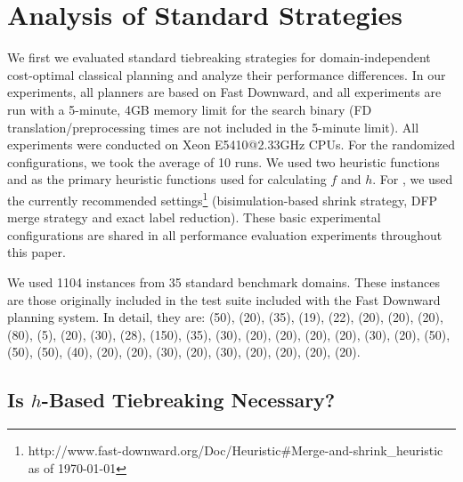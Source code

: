 \section{Analysis of Standard Strategies}
\label{sec:eval-common-strategies}

We first 
we evaluated standard tiebreaking strategies for domain-independent cost-optimal
classical planning and analyze their performance differences.  
In our experiments, all planners are based on Fast
Downward, and all experiments are run with a 5-minute,
4GB memory limit for the search binary (FD translation/preprocessing
times are not included in the 5-minute limit).  All experiments were
conducted on Xeon E5410@2.33GHz CPUs. For the randomized configurations, we took the average of 10 runs.
% 
We used two \sota heuristic functions \lmcut \cite{Helmert2009} and \mands \cite{HelmertHHN14} as the primary
heuristic functions used for calculating $f$ and $h$.  For \mands, we used the currently recommended
settings\footnote{http://www.fast-downward.org/Doc/Heuristic\#Merge-and-shrink\_heuristic as of \today}
(bisimulation-based shrink strategy, DFP merge strategy and exact label reduction).  These basic experimental
configurations are shared in all performance evaluation experiments throughout this paper. 

We used 1104 instances from 35 standard benchmark domains. These
instances are those originally included in the test suite included with the Fast
Downward planning system. In detail, they are: (50),
(20), (35), (19), (22), (20),
(20), (20), (80), (5),
(20), (30), (28), (150), (35),
(30), (20), (20),
(20), (20), (30),
(20), (50), (50),
(50), (40), (20), (20),
(30), (20), (30), (20),
(20), (20), (20).

\subsection{Is $h$-Based Tiebreaking Necessary?}

